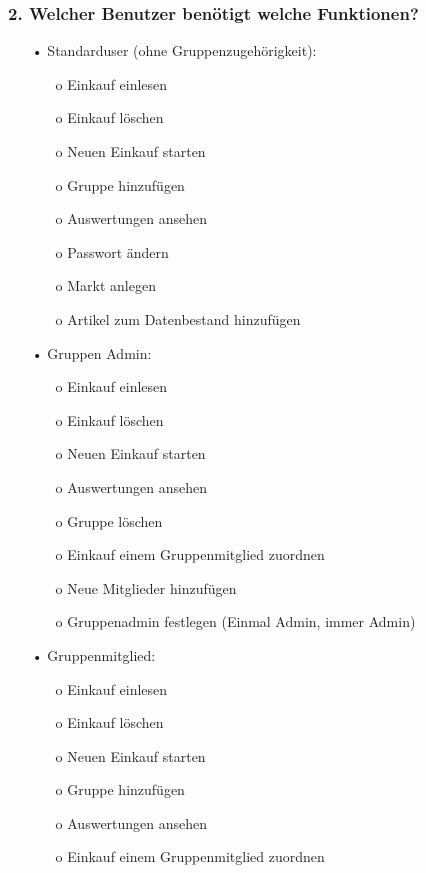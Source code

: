 \documentclass[12pt,a4paper]{article}
\begin{document}
\subsubsection*{2. Welcher Benutzer benötigt welche Funktionen?}
\begin{itemize}
\item[•]Standarduser (ohne Gruppenzugehörigkeit):
\begin{itemize}
\item[o] Einkauf einlesen
\item[o] Einkauf löschen
\item[o] Neuen Einkauf starten
\item[o] Gruppe hinzufügen
\item[o] Auswertungen ansehen
\item[o] Passwort ändern
\item[o] Markt anlegen
\item[o] Artikel zum Datenbestand hinzufügen
\end{itemize}       
\end{itemize} 

\begin{itemize}
\item[•]Gruppen Admin:
\begin{itemize}
\item[o] Einkauf einlesen
\item[o] Einkauf löschen
\item[o] Neuen Einkauf starten
\item[o] Auswertungen ansehen
\item[o] Gruppe löschen
\item[o] Einkauf einem Gruppenmitglied zuordnen
\item[o] Neue Mitglieder hinzufügen
\item[o] Gruppenadmin festlegen (Einmal Admin, immer Admin)
\end{itemize}
\end{itemize}

\begin{itemize}
\item[•] Gruppenmitglied:
\begin{itemize}
\item[o] Einkauf einlesen
\item[o] Einkauf löschen
\item[o] Neuen Einkauf starten
\item[o] Gruppe hinzufügen
\item[o] Auswertungen ansehen
\item[o] Einkauf einem Gruppenmitglied zuordnen
\end{itemize}
\end{itemize}
\end{document}
